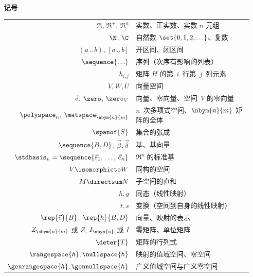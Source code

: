 \thispagestyle{empty}
\begin{center}
  \textbf{记号}  \\[2ex]
  \begin{tabular}{r|l}
    \( \Re \), \( \Re^+ \), \( \Re^n \) &实数、正实数、实数 $n$ 元组 \\
    \( \N              \),
    \( \C              \)  &自然数 \( \set{0,1,2,\ldots} \)、复数                           \\
    \( (a\,..\,b) \), \( [a\,..\,b] \) &开区间、闭区间   \\
    \( \sequence{\ldots} \)&序列（次序有影响的列表）    \\
    \( h_{i,j} \)          &矩阵 $H$ 的第~\( i \)~行第~\( j \)~列元素 \\
    \( V,W,U \)            &向量空间               \\
    \( \vec{v} \),
    $\zero$, $\zero_V$     &向量、零向量、空间~$V$ 的零向量   \\
    \( \polyspace_n \), \( \matspace_{\nbym{n}{m}} \)
                          &\( n \)~次多项式空间、\( \nbym{n}{m} \) 矩阵的全体      \\
    \( \spanof{S} \)       &集合的张成                   \\
    \( \sequence{B,D} \), \( \vec{\beta},\vec{\delta} \)
                          &基、基向量  \\
    \( \stdbasis_n=\sequence{\vec{e}_1,\,\ldots,\,\vec{e}_n} \)
                          &\( \Re^n \) 的标准基  \\
    \( V\isomorphicto W \) &同构的空间                         \\
    \( M\directsum N \)    &子空间的直和                   \\
    \( h,g \)              &同态（线性映射）                \\
    \( t,s \)              &变换（空间到自身的线性映射） \\
    \( \rep{\vec{v}}{B} \), \( \rep{h}{B,D} \)
                          &向量、映射的表示    \\
    \( Z_{\nbym{n}{m}} \) 或 \( Z \), \(I_{\nbyn{n}}\) 或 \( I \)  &零矩阵、单位矩阵    \\
    \( \deter{T} \)        &矩阵的行列式       \\
    \( \rangespace{h},\nullspace{h} \)
                           &映射的值域空间、零空间  \\
    \( \genrangespace{h},\gennullspace{h} \)
                           &广义值域空间与广义零空间
  \end{tabular}
\end{center}

